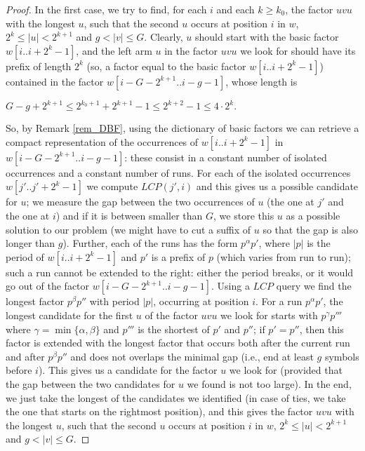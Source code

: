 \documentclass[final]{dmtcs-episciences}
\newcommand{\LCP}{{\mathit{LCP}}}
\begin{document}
\begin{proof}
In the first case, we try to find, for each $i$ and each $k\geq k_0$, the factor $uvu$ with the longest $u$, such that the second $u$ occurs at position $i$ in $w$, $ 2^k \leq |u|< 2^{k+1}$ and $g<|v|\leq G$. Clearly, $u$ should start with the basic factor $w[i..i+2^k-1]$, and the left arm $u$ in the factor $uvu$ we look for should have its prefix of length $2^k$ (so, a factor equal to the basic factor $w[i..i+2^k-1]$) contained in the factor $w[i-G-2^{k+1}..i-g-1]$, whose length is \centerline{$G-g+2^{k+1}\leq 2^{k_0+1}+2^{k+1}-1\leq 2^{k+2}-1\leq 4\cdot 2^k.$} So, by Remark \ref{rem_DBF}, using the dictionary of basic factors we can 
retrieve a compact representation of the occurrences of $w[i..i+2^k-1]$ in $w[i-G-2^{k+1}..i-g-1]$: these consist in a constant number of isolated occurrences and a constant number of runs. For each of the isolated occurrences $w[j'..j'+2^k-1]$ we compute $\LCP(j',i)$ and this gives us a possible candidate for $u$; we measure the gap between the two occurrences of $u$ (the one at $j'$ and the one at $i$) and if it is between smaller than $G$, we store this $u$ as a possible solution to our problem (we might have to cut a suffix of $u$ so that the gap is also longer than $g$). Further, each of the runs has the form $p^\alpha p'$, where $|p|$ is the period of $w[i..i+2^k-1]$ and $p'$ is a prefix of $p$ (which varies from run to run); such a run cannot be extended to the right: either the period breaks, or it would go out of the factor $w[i-G-2^{k+1}..i-g-1]$. Using a $\LCP$ query we find the longest factor $p^\beta p''$ with period $|p|$, occurring at position $i$. For a run $p^\alpha p'$, the longest candidate for the first $u$ of the factor $uvu$ we look for starts with $p^\gamma p'''$ where $\gamma=\min\{\alpha,\beta\}$ and $p'''$ is the shortest of $p'$ and $p''$; if $p'=p''$, then this factor is extended with the longest factor that occurs both after the current run and after $p^\beta p''$ and does not overlaps the minimal gap (i.e., end at least $g$ symbols before $i$). This gives us 
a candidate for the factor $u$ we look for (provided that the gap between the two candidates for $u$ we found is not too large). In the end, we just take the longest of the candidates we identified (in case of ties, we take the one that starts on the rightmost position), and this gives the factor $uvu$ with the longest $u$, such that the second $u$ occurs at position $i$ in $w$, $ 2^k \leq |u|< 2^{k+1}$ and $g<|v|\leq G$. 


\end{proof}
\end{document}
